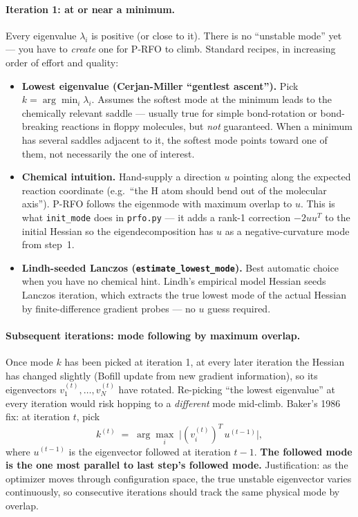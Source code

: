 \documentclass[11pt]{article}
\begin{document}
\paragraph{Iteration 1: at or near a minimum.}
Every eigenvalue $\lambda_i$ is positive (or close to it).  There is no
``unstable mode'' yet --- you have to \emph{create} one for P-RFO to climb.
Standard recipes, in increasing order of effort and quality:
\begin{itemize}
  \item \textbf{Lowest eigenvalue (Cerjan-Miller ``gentlest ascent'').}
        Pick $k = \arg\min_i \lambda_i$.  Assumes the softest mode at the
        minimum leads to the chemically relevant saddle --- usually true for
        simple bond-rotation or bond-breaking reactions in floppy molecules,
        but \emph{not} guaranteed.  When a minimum has several saddles
        adjacent to it, the softest mode points toward one of them, not
        necessarily the one of interest.
  \item \textbf{Chemical intuition.}  Hand-supply a direction $u$ pointing
        along the expected reaction coordinate (e.g.\ ``the H atom should
        bend out of the molecular axis'').  P-RFO follows the eigenmode
        with maximum overlap to $u$.  This is what \texttt{init\_mode}
        does in \texttt{prfo.py} --- it adds a rank-1 correction
        $-2 u u^T$ to the initial Hessian so the eigendecomposition has
        $u$ as a negative-curvature mode from step~1.
  \item \textbf{Lindh-seeded Lanczos (\texttt{estimate\_lowest\_mode}).}
        Best automatic choice when you have no chemical hint.  Lindh's
        empirical model Hessian seeds Lanczos iteration, which extracts
        the true lowest mode of the actual Hessian by finite-difference
        gradient probes --- no $u$ guess required.
\end{itemize}

\paragraph{Subsequent iterations: mode following by maximum overlap.}
Once mode $k$ has been picked at iteration 1, at every later iteration the
Hessian has changed slightly (Bofill update from new gradient information),
so its eigenvectors $v_1^{(t)}, \dots, v_N^{(t)}$ have rotated.  Re-picking
``the lowest eigenvalue'' at every iteration would risk hopping to a
\emph{different} mode mid-climb.  Baker's 1986 fix: at iteration $t$, pick
\begin{equation*}
  k^{(t)} \;=\; \arg\max_i\;\bigl| (v_i^{(t)})^T\, u^{(t-1)} \bigr|,
\end{equation*}
where $u^{(t-1)}$ is the eigenvector followed at iteration $t-1$.
\textbf{The followed mode is the one most parallel to last step's followed
mode.}  Justification: as the optimizer moves through configuration space,
the true unstable eigenvector varies continuously, so consecutive iterations
should track the same physical mode by overlap.
\end{document}

